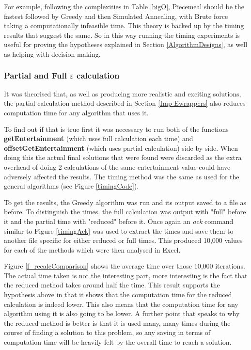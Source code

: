 \documentclass[12pt]{report}
\begin{document}
For example, following the complexities in Table \ref{bigO}, Piecemeal should be the fastest followed by Greedy and then Simulated Annealing, with Brute force taking a computationally infeasible time. This theory is backed up by the timing results that suggest the same. So in this way running the timing experiments is useful for proving the  hypotheses explained in Section \ref{AlgorithmDesigns}, as well as helping with decision making.

\subsubsection{Partial and Full $\varepsilon$ calculation}
It was theorised that, as well as producing more realistic and exciting solutions, the partial calculation method described in Section \ref{Imp-Ewrappers} also reduces computation time for any algorithm that uses it.

To find out if that is true first it was necessary to run both of the functions \textbf{getEntertainment} (which uses full calculation each time) and \textbf{offsetGetEntertainment} (which uses partial calculation) side by side. When doing this the actual final solutions that were found were discarded as the extra overhead of doing 2 calculations of the same entertainment value could have adversely affected the results. The timing method was the same as used for the general algorithms (see Figure \ref{timingCode}).

To get the results, the Greedy algorithm was run and its output saved to a file as before. To distinguish the times, the full calculation was output with "full" before it and the partial time with "reduced" before it. Once again an \textit{ack} command similar to Figure \ref{timingAck} was used to extract the times and save them to another file specific for either reduced or full times. This produced 10,000 values for each of the methods which were then analysed in Excel.

Figure \ref{f_recalcComparison} shows the average time over those 10,000 iterations. The actual time taken is not the interesting part, more interesting is the fact that the reduced method takes around half the time. This result supports the hypothesis above in that it shows that the computation time for the reduced calculation is indeed lower. This also means that the computation time for any algorithm using it is also going to be lower. A further point that speaks to why the reduced method is better is that it is used many, many times during the course of finding a solution to this problem, so any saving in terms of computation time will be heavily felt by the overall time to reach a solution.
\end{document}
